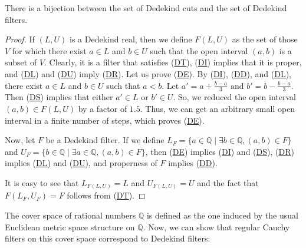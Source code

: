 \documentclass[reqno]{amsart}
\newcommand{\axref}[1]{(\hyperref[ax:#1]{#1})}
\theoremstyle{definition}
\theoremstyle{remark}
\numberwithin{figure}{section}
\begin{document}
\begin{prop}
There is a bijection between the set of Dedekind cuts and the set of Dedekind filters.
\end{prop}
\begin{proof}
If $(L,U)$ is a Dedekind real, then we define $F(L,U)$ as the set of those $V$ for which there exist $a \in L$ and $b \in U$ such that the open interval $(a,b)$ is a subset of $V$.
Clearly, it is a filter that satisfies \axref{DT}, \axref{DI} implies that it is proper, and \axref{DL} and \axref{DU} imply \axref{DR}.
Let us prove \axref{DE}.
By \axref{DI}, \axref{DD}, and \axref{DL}, there exist $a \in L$ and $b \in U$ such that $a < b$.
Let $a' = a + \frac{b - a}{3}$ and $b' = b - \frac{b - a}{3}$.
Then \axref{DS} implies that either $a' \in L$ or $b' \in U$.
So, we reduced the open interval $(a,b) \in F(L,U)$ by a factor of $1.5$.
Thus, we can get an arbitrary small open interval in a finite number of steps, which proves \axref{DE}.

Now, let $F$ be a Dedekind filter.
If we define $L_F = \{ a \in \mathbb{Q} \mid \exists b \in \mathbb{Q}, (a,b) \in F \}$ and $U_F = \{ b \in \mathbb{Q} \mid \exists a \in \mathbb{Q}, (a,b) \in F \}$,
then \axref{DE} implies \axref{DI} and \axref{DS}, \axref{DR} implies \axref{DL} and \axref{DU}, and properness of $F$ implies \axref{DD}.

It is easy to see that $L_{F(L,U)} = L$ and $U_{F(L,U)} = U$ and the fact that $F(L_F,U_F) = F$ follows from \axref{DT}.
\end{proof}

The cover space of rational numbers $\mathbb{Q}$ is defined as the one induced by the usual Euclidean metric space structure on $\mathbb{Q}$.
Now, we can show that regular Cauchy filters on this cover space correspond to Dedekind filters:
\end{document}
